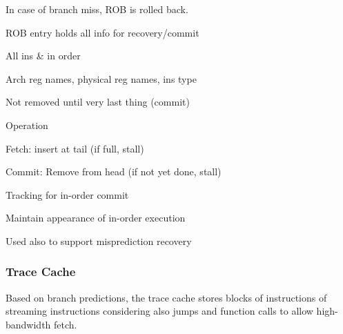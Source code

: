 \documentclass[a4paper, fontsize=8pt, landscape, DIV=1]{scrartcl}
\makeatletter
\renewenvironment{outline}[1][]{%
  \ifthenelse{\equal{#1}{}}{}{\renewcommand{\ol@type}{#1}}%
  \ol@z%
  \newcommand{\0}{\ol@toz\ol@z}%
  \newcommand{\1}{\vspace{\dimexpr\outlinespacingscalar\baselineskip-\baselineskip}\ol@toi\ol@i\item}%
  \newcommand{\2}{\vspace{\dimexpr\outlinespacingscalartwo\baselineskip-\baselineskip}\ol@toii\ol@ii\item}%
  \newcommand{\3}{\vspace{\dimexpr\outlinespacingscalar\baselineskip-\baselineskip}\ol@toiii\ol@iii\item}%
  \newcommand{\4}{\vspace{\dimexpr\outlinespacingscalar\baselineskip-\baselineskip}\ol@toiiii\ol@iiii\item}%
}{%
  \ol@toz\ol@exit%
}
\def\outlinespacingscalar{0.5}
\def\outlinespacingscalartwo{0.5}
\makeatother
\begin{document}
\begin{multicols*}{4}
  In case of branch miss, ROB is rolled back.
  \begin{outline}
    \1 ROB entry holds all info for recovery/commit
      \2 All ins \& in order
      \2 Arch reg names, physical reg names, ins type
      \2 Not removed until very last thing (commit)
    \1 Operation
      \2 Fetch: insert at tail (if full, stall)
      \2 Commit: Remove from head (if not yet done, stall)
    \1 Tracking for in-order commit
      \2 Maintain appearance of in-order execution
      \2 Used also to support misprediction recovery
  \end{outline}

  \subsubsection{Trace Cache}
  Based on branch predictions, the trace cache stores blocks of instructions of streaming
  instructions considering also jumps and function calls to allow high-bandwidth fetch.


\end{multicols*}
\end{document}
